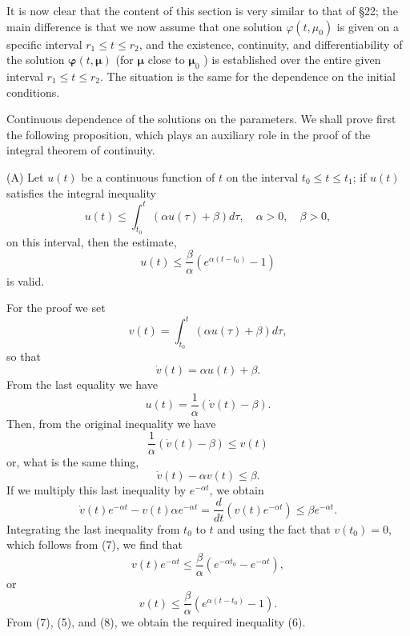 \documentclass[10pt,a5paper]{book}
\theoremstyle{plain}
\theoremstyle{definition}
\theoremstyle{remark}
\begin{document}
It is now clear that the content of this section is very similar to that of §22; the main difference is that we now assume that one solution $\varphi\left(t, \mu_{0}\right)$ is given on a specific interval $r_{1} \leq t \leq r_{2}$, and the existence, continuity, and differentiability of the solution $\boldsymbol{\varphi}(t, \boldsymbol{\mu})$ (for $\boldsymbol{\mu}$ close to $\boldsymbol{\mu}_{0}$ ) is established over the entire given interval $r_{1} \leq t \leq r_{2}$. The situation is the same for the dependence on the initial conditions.

Continuous dependence of the solutions on the parameters. We shall prove first the following proposition, which plays an auxiliary role in the proof of the integral theorem of continuity.

(A) Let $u(t)$ be a continuous function of $t$ on the interval $t_{0} \leq t \leq t_{1}$; if $u(t)$ satisfies the integral inequality
\begin{equation*}
u(t) \leq \int_{t_{0}}^{t}(\alpha u(\tau)+\beta) d \tau, \quad \alpha>0, \quad \beta>0, \tag{5}
\end{equation*}
on this interval, then the estimate,
\begin{equation*}
u(t) \leq \frac{\beta}{\alpha}\left(e^{\alpha\left(t-t_{0}\right)}-1\right) \tag{6}
\end{equation*}
is valid.

For the proof we set
\begin{equation*}
v(t)=\int_{t_{0}}^{t}(\alpha u(\tau)+\beta) d \tau, \tag{7}
\end{equation*}
so that
\[
\dot{v}(t)=\alpha u(t)+\beta .
\]
From the last equality we have
\[
u(t)=\frac{1}{\alpha}(\dot{v}(t)-\beta) .
\]
Then, from the original inequality we have
\[
\frac{1}{\alpha}(\dot{v}(t)-\beta) \leq v(t)
\]
or, what is the same thing,
\[
\dot{v}(t)-\alpha v(t) \leq \beta .
\]
If we multiply this last inequality by $e^{-\alpha t}$, we obtain
\[
\dot{v}(t) e^{-\alpha t}-v(t) \alpha e^{-\alpha t}=\frac{d}{d t}\left(v(t) e^{-\alpha t}\right) \leq \beta e^{-\alpha t} .
\]
Integrating the last inequality from $t_{0}$ to $t$ and using the fact that $v\left(t_{0}\right)=0$, which follows from (7), we find that
\[
v(t) e^{-\alpha t} \leq \frac{\beta}{\alpha}\left(e^{-\alpha t_{0}}-e^{-\alpha t}\right),
\]
or
\begin{equation*}
v(t) \leq \frac{\beta}{\alpha}\left(e^{\alpha\left(t-t_{0}\right)}-1\right) . \tag{8}
\end{equation*}
From (7), (5), and (8), we obtain the required inequality (6).
\end{document}
